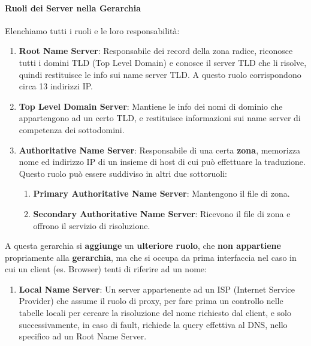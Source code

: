 \documentclass{article}
\begin{document}
\newpage

\paragraph{Ruoli dei Server nella Gerarchia} Elenchiamo tutti i ruoli e le loro responsabilità:

\begin{enumerate}
    \item \textbf{Root Name Server}: Responsabile dei record della zona radice, riconosce tutti i domini TLD (Top Level Domain) e conosce il server TLD che li risolve, quindi restituisce le info sui name server TLD. A questo ruolo corrispondono circa 13 indirizzi IP.
    \item \textbf{Top Level Domain Server}: Mantiene le info dei nomi di dominio che appartengono ad un certo TLD, e restituisce informazioni sui name server di competenza dei sottodomini.
    \item \textbf{Authoritative Name Server}: Responsabile di una certa \textbf{zona}, memorizza nome ed indirizzo IP di un insieme di host di cui può effettuare la traduzione. Questo ruolo può essere suddiviso in altri due sottoruoli:
    \begin{enumerate}
        \item \textbf{Primary Authoritative Name Server}: Mantengono il file di zona.
        \item \textbf{Secondary Authoritative Name Server}: Ricevono il file di zona e offrono il servizio di risoluzione.
    \end{enumerate}
\end{enumerate}

A questa gerarchia si \textbf{aggiunge} un \textbf{ulteriore ruolo}, che \textbf{non appartiene} propriamente alla \textbf{gerarchia}, ma che si occupa da prima interfaccia nel caso in cui un client (es. Browser) tenti di riferire ad un nome:

\begin{enumerate}
    \item \textbf{Local Name Server}: Un server appartenente ad un ISP (Internet Service Provider) che assume il ruolo di proxy, per fare prima un controllo nelle tabelle locali per cercare la risoluzione del nome richiesto dal client, e solo successivamente, in caso di fault, richiede
    la query effettiva al DNS, nello specifico ad un Root Name Server.    
\end{enumerate}

\vspace*{-10px}
\end{document}
